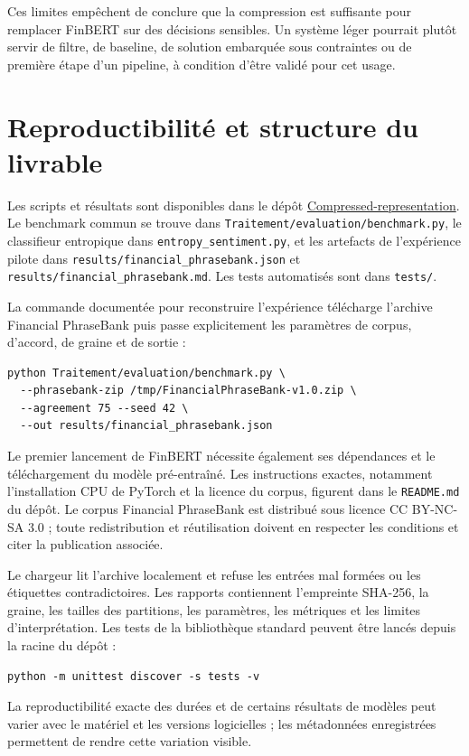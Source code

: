 \documentclass[11pt,a4paper]{article}
\begin{document}
Ces limites empêchent de conclure que la compression est suffisante pour
remplacer FinBERT sur des décisions sensibles. Un système léger pourrait
plutôt servir de filtre, de baseline, de solution embarquée sous contraintes
ou de première étape d'un pipeline, à condition d'être validé pour cet usage.

\section{Reproductibilité et structure du livrable}

Les scripts et résultats sont disponibles dans le dépôt
\href{https://github.com/EtiennePellissier/Compressed-representation}{Compressed-representation}.
Le benchmark commun se trouve dans
\texttt{Traitement/evaluation/benchmark.py}, le classifieur entropique dans
\texttt{entropy\_sentiment.py}, et les artefacts de l'expérience pilote dans
\texttt{results/financial\_phrasebank.json} et
\texttt{results/financial\_phrasebank.md}. Les tests automatisés sont dans
\texttt{tests/}.

La commande documentée pour reconstruire l'expérience télécharge l'archive
Financial PhraseBank puis passe explicitement les paramètres de corpus,
d'accord, de graine et de sortie :
\begin{lstlisting}
python Traitement/evaluation/benchmark.py \
  --phrasebank-zip /tmp/FinancialPhraseBank-v1.0.zip \
  --agreement 75 --seed 42 \
  --out results/financial_phrasebank.json
\end{lstlisting}
Le premier lancement de FinBERT nécessite également ses dépendances et le
téléchargement du modèle pré-entraîné. Les instructions exactes, notamment
l'installation CPU de PyTorch et la licence du corpus, figurent dans le
\texttt{README.md} du dépôt. Le corpus Financial PhraseBank est distribué sous
licence CC BY-NC-SA 3.0 ; toute redistribution et réutilisation doivent en
respecter les conditions et citer la publication associée.

Le chargeur lit l'archive localement et refuse les entrées mal formées ou les
étiquettes contradictoires. Les rapports contiennent l'empreinte SHA-256,
la graine, les tailles des partitions, les paramètres, les métriques et les
limites d'interprétation. Les tests de la bibliothèque standard peuvent être
lancés depuis la racine du dépôt :
\begin{lstlisting}
python -m unittest discover -s tests -v
\end{lstlisting}
La reproductibilité exacte des durées et de certains résultats de modèles
peut varier avec le matériel et les versions logicielles ; les métadonnées
enregistrées permettent de rendre cette variation visible.
\end{document}
